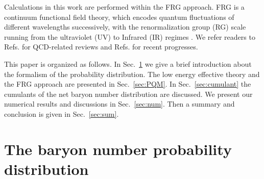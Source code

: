 \documentclass[%
reprint,
superscriptaddress,
showpacs,preprintnumbers,
 amsmath,amssymb,
 aps,
prd,
]{revtex4-1}
\begin{document}
Calculations in this work are performed within the FRG approach. FRG is a continuum functional field theory, which encodes quantum fluctuations of different wavelengths successively, with the renormalization group (RG) scale running from the ultraviolet (UV) to Infrared (IR) regimes \cite{Wetterich:1992yh}. We refer readers to Refs. \cite{Litim:1998nf, Berges:2000ew,Pawlowski:2005xe,Gies:2006wv,Schaefer:2006sr,Pawlowski:2010ht,Braun:2011pp,vonSmekal:2012vx} for QCD-related reviews and Refs. \cite{Pawlowski:2014aha,Pawlowski:2014zaa,Helmboldt:2014iya,Mitter:2014wpa,Braun:2014ata,Rennecke:2015eba,Fu:2015naa,Fu:2015amv,Wang:2015bky,Cyrol:2016tym,Fu:2016tey,Rennecke:2016tkm,Cyrol:2017ewj,Cyrol:2017qkl,Fu:2017vvg,Cyrol:2018xeq} for recent progresses. 

This paper is organized as follows. In Sec.~\ref{sec:probability} we give a brief introduction about the formalism of the probability distribution. The low energy effective theory and the FRG approach are presented in Sec.~\ref{sec:PQM}. In Sec.~\ref{sec:cumulant} the cumulants of the net baryon number distribution are discussed. We present our numerical results and discussions in Sec.~\ref{sec:num}. Then a summary and conclusion is given in Sec.~\ref{sec:sum}.


\section{The baryon number probability distribution}
\label{sec:probability}
\end{document}
